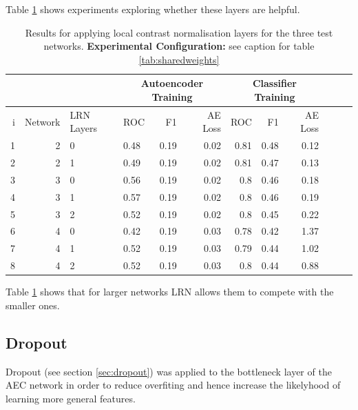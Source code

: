       Table \ref{tab:lrn} shows experiments exploring whether these layers are helpful.
      \begin{table}[!h] \centering
      {\small
      \begin{tabular}{rrllrrrrrrrr}
        &&&   \multicolumn{3}{|c|}{Autoencoder Training} &  \multicolumn{3}{c|}{Classifier Training}    \\
      \hline
        i & Network             & LRN Layers   &    ROC&F1&AE Loss & ROC & F1 & AE Loss \\
      \hline
       1 & 2 & 0  &    0.48 &   0.19 &     0.02 &    0.81 &   0.48 &     0.12 \\
       2 & 2 & 1  &    0.49 &   0.19 &     0.02 &    0.81 &   0.47 &     0.13 \\
      \hline
       3 & 3 & 0  &    0.56 &   0.19 &     0.02 &    0.8  &   0.46 &     0.18 \\
       4 & 3 & 1  &    0.57 &   0.19 &     0.02 &    0.8  &   0.46 &     0.19 \\
       5 & 3 & 2  &    0.52 &   0.19 &     0.02 &    0.8  &   0.45 &     0.22 \\
      \hline
       6 & 4 & 0  &    0.42 &   0.19 &     0.03 &    0.78 &   0.42 &     1.37 \\
       7 & 4 & 1  &    0.52 &   0.19 &     0.03 &    0.79 &   0.44 &     1.02 \\
       8 & 4 & 2  &    0.52 &   0.19 &     0.03 &    0.8  &   0.44 &     0.88 \\
       \hline
      \end{tabular}}\caption{Results for applying local contrast normalisation layers
      for the three test networks. {\bf Experimental Configuration:} see caption
      for table \ref{tab:sharedweights}}\label{tab:lrn}  \end{table}

      Table \ref{tab:lrn} shows that for larger networks LRN allows them to compete with
      the smaller ones.

      \newpage
    \subsection{Dropout}
      Dropout (see section \ref{sec:dropout}) was applied to the bottleneck layer of the AEC network in order to reduce overfiting and
      hence increase the likelyhood of learning more general features.

